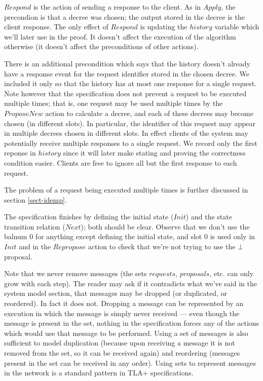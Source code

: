 \documentclass[12pt,a4paper,en]{pracamgr}
\begin{document}
$Respond$ is the action of sending a response to the client. As in $Apply$, the precondion is that a decree was chosen; the output stored in the decree is the client response. The only effect of $Respond$ is updating the $history$ variable which we'll later use in the proof. It doesn't affect the execution of the algorithm otherwise (it doesn't affect the preconditions of other actions).

There is an additional precondition which says that the history doesn't already have a response event for the request identifier stored in the chosen decree. We included it only so that the history has at most one response for a single request. Note however that the specification does not prevent a request to be executed multiple times; that is, one request may be used multiple times by the $ProposeNew$ action to calculate a decree, and each of these decrees may become chosen (in different slots). In particular, the identifier of this request may appear in multiple decrees chosen in different slots. In effect clients of the system may potentially receive multiple responses to a single request. We record only the first reponse in $history$ since it will later make stating and proving the correctness condition easier. Clients are free to ignore all but the first response to each request.

The problem of a request being executed multiple times is further discussed in section \ref{sect-idemp}.

The specification finishes by defining the initial state ($Init$) and the state transition relation ($Next$); both should be clear. Observe that we don't use the balnum $0$ for anything except defining the initial state, and slot $0$ is used only in $Init$ and in the $Repropose$ action to check that we're not trying to use the $\bot$ proposal.

Note that we never remove messages (the sets $requests$, $proposals$, etc. can only grow with each step). The reader may ask if it contradicts what we've said in the system model section, that messages may be dropped (or duplicated, or reordered). In fact it does not. Dropping a message can be represented by an execution in which the message is simply never received --- even though the message is present in the set, nothing in the specification forces any of the actions which would use that message to be performed. Using a set of messages is also sufficient to model duplication (because upon receiving a message it is not removed from the set, so it can be received again) and reordering (messages present in the set can be received in any order). Using sets to represent messages in the network is a standard pattern in TLA+ specifications.
\end{document}
